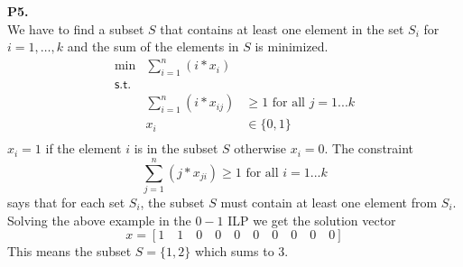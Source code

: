 \documentclass[11pt]{article}
\begin{document}
\noindent\textbf{P5.}
\\
We have to find a subset $S$ that contains at least one element in the set $S_i$ for $i = 1,\ldots, k$ and the sum of the elements in $S$ is minimized.
\[\begin{array}{rlllllllll}
\min & \sum_{i=1}^{n} (i*x_i) \\
\mathsf{s.t. } \\
& \sum_{i=1}^{n} (i*x_{ij}) & \geq 1 \text{ for all }j = 1...k\\
& x_i & \in \{0,1\} \\
\end{array}\]
$x_i = 1$ if the element $i$ is in the subset $S$ otherwise $x_i = 0$.  The constraint 
$$
\sum_{j=1}^{n} (j*x_{ji}) \geq 1 \text{ for all }i = 1...k
$$
says that for each set $S_i$, the subset $S$ must contain at least one element from $S_i$.  Solving the above example in the $0-1$ ILP we get the solution vector 
$$
x = [1\quad1\quad0\quad0\quad0\quad0\quad0\quad0\quad0\quad0]
$$ 
This means the subset $S = \{1, 2\}$ which sums to 3.
\end{document}
